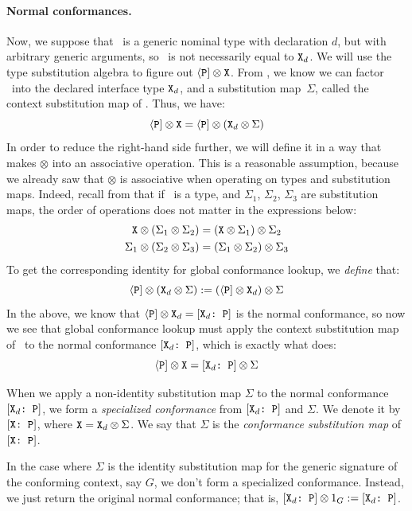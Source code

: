 \documentclass[../generics]{subfiles}
\begin{document}
\paragraph{Normal conformances.} Now, we suppose that \tX\ is a generic nominal type with declaration $d$, but with arbitrary generic arguments, so \tX\ is not necessarily equal to $\texttt{X}_d$. We will use the type substitution algebra to figure out $\langle\texttt{P}] \otimes \texttt{X}$. From , we know we can factor \tX\ into the declared interface type $\texttt{X}_d$, and a substitution map~$\Sigma$, called the context substitution map of \tX. Thus, we have:
\[
\langle\texttt{P}] \otimes \texttt{X} = \langle\texttt{P}] \otimes (\texttt{X}_d \otimes \Sigma)
\]
In order to reduce the right-hand side further, we will define it in a way that makes $\otimes$ into an associative operation. This is a reasonable assumption, because we already saw that $\otimes$ is associative when operating on types and substitution maps. Indeed, recall from  that if \tX\ is a type, and $\Sigma_1$, $\Sigma_2$, $\Sigma_3$ are substitution maps, the order of operations does not matter in the expressions below:
\begin{gather*}
\texttt{X}\otimes(\Sigma_1\otimes\Sigma_2)=(\texttt{X}\otimes\Sigma_1)\otimes\Sigma_2\\
\Sigma_1\otimes(\Sigma_2\otimes\Sigma_3)=(\Sigma_1\otimes\Sigma_2)\otimes\Sigma_3
\end{gather*}
To get the corresponding identity for global conformance lookup, we \emph{define} that:
\[
\langle\texttt{P}] \otimes (\texttt{X}_d \otimes \Sigma) := (\langle\texttt{P}] \otimes \texttt{X}_d) \otimes \Sigma
\]
In the above, we know that $\langle\texttt{P}] \otimes \texttt{X}_d=[\texttt{$\texttt{X}_d$:~P}]$ is the normal conformance, so now we see that global conformance lookup must apply the context substitution map of \tX\ to the normal conformance $[\texttt{$\texttt{X}_d$:~P}]$, which is exactly what  does:
\[
\langle\texttt{P}] \otimes \texttt{X} = [\texttt{$\texttt{X}_d$:~P}] \otimes \Sigma
\]

When we apply a non-identity substitution map $\Sigma$ to the normal conformance $[\texttt{$\texttt{X}_d$:~P}]$, we form a \emph{specialized conformance} from $[\texttt{$\texttt{X}_d$:~P}]$ and $\Sigma$. We denote it by $[\texttt{X:~P}]$, where $\texttt{X}=\texttt{X}_d\otimes\Sigma$. We say that $\Sigma$ is the \emph{conformance substitution map} of $[\texttt{X:~P}]$.

In the case where $\Sigma$ is the identity substitution map for the generic signature of the conforming context, say $G$, we don't form a specialized conformance. Instead, we just return the original normal conformance; that is, $[\texttt{$\texttt{X}_d$:~P}] \otimes 1_G := [\texttt{$\texttt{X}_d$:~P}]$.
\end{document}
